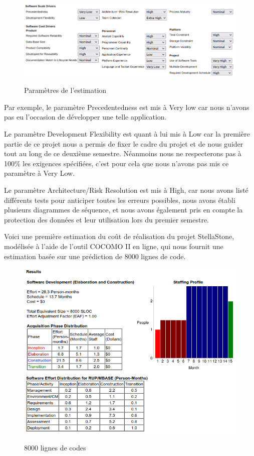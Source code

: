 \documentclass[a4paper, 12pt]{article}
\begin{document}
 \begin{figure}[!h]
    \centering
    \includegraphics[scale=0.5]{ccmo.png}
    \label{fig:Le_planning}
    \caption{Paramètres de l'estimation}
\end{figure}

Par exemple, le paramètre Precedentedness est mis à Very low car nous n'avons pas eu l'occasion de développer une telle application.

Le paramètre Development Flexibility est quant à lui mis à Low car la première partie de ce projet nous a permis de fixer le cadre du projet et de nous guider tout au long de ce deuxième semestre. Néanmoins nous ne respecterons pas à 100\% les exigences spécifiées, c'est pour cela que nous n'avons pas mis ce paramètre à Very Low.

Le paramètre Architecture/Risk Resolution est mis à High, car nous avons listé différents tests pour anticiper toutes les erreurs possibles, nous avons établi plusieurs diagrammes de séquence, et nous avons également pris en compte la protection des données et leur utilisation lors du premier semestre. 

\newpage
Voici une première estimation du coût de réalisation du projet StellaStone, modélisée à l'aide de l'outil COCOMO II en ligne, qui nous fournit une estimation basée sur une prédiction de 8000 lignes de code. 


 \begin{figure}[!h]
    \centering
    \includegraphics[scale=0.75]{ccmo3.png}
    \label{fig:Le_planning}
    \caption{8000 lignes de codes}
\end{figure}
\end{document}
